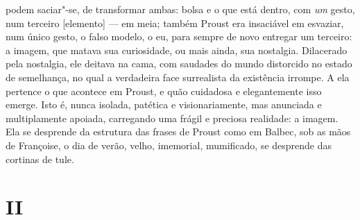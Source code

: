 podem saciar"-se, de transformar ambas: bolsa e o que está dentro, com
\emph{um} gesto, num terceiro {[}elemento{]} --- em meia; também Proust
era insaciável em esvaziar, num único gesto, o falso modelo, o eu, para
sempre de novo entregar um terceiro: a imagem, que matava sua
curiosidade, ou mais ainda, sua nostalgia. Dilacerado pela nostalgia,
ele deitava na cama, com saudades do mundo distorcido no estado de
semelhança, no qual a verdadeira face surrealista da existência irrompe.
A ela pertence o que acontece em Proust, e quão cuidadosa e
elegantemente isso emerge. Isto é, nunca isolada, patética e
visionariamente, mas anunciada e multiplamente apoiada, carregando uma
frágil e preciosa realidade: a imagem. Ela se desprende da estrutura das
frases de Proust como em Balbec, sob as mãos de Françoise, o dia de
verão, velho, imemorial, mumificado, se desprende das cortinas de tule.

\section{II}

